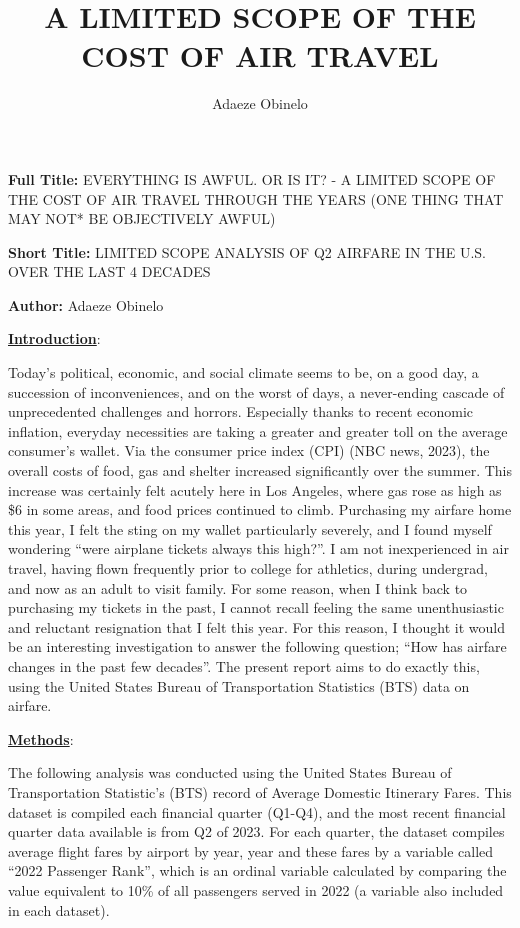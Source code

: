 \documentclass[
  letterpaper,
  DIV=11,
  numbers=noendperiod]{scrartcl}
\title{A LIMITED SCOPE OF THE COST OF AIR TRAVEL}
\author{Adaeze Obinelo}
\date{}
\begin{document}
\maketitle
\ifdefined\Shaded\renewenvironment{Shaded}{\begin{tcolorbox}[boxrule=0pt, interior hidden, breakable, frame hidden, sharp corners, enhanced, borderline west={3pt}{0pt}{shadecolor}]}{\end{tcolorbox}}\fi

\textbf{Full Title:} EVERYTHING IS AWFUL. OR IS IT? - A LIMITED SCOPE OF
THE COST OF AIR TRAVEL THROUGH THE YEARS (ONE THING THAT MAY NOT* BE
OBJECTIVELY AWFUL)

\textbf{Short Title:} LIMITED SCOPE ANALYSIS OF Q2 AIRFARE IN THE U.S.
OVER THE LAST 4 DECADES

\textbf{Author:} Adaeze Obinelo

\ul{\textbf{Introduction}}:

Today's political, economic, and social climate seems to be, on a good
day, a succession of inconveniences, and on the worst of days, a
never-ending cascade of unprecedented challenges and horrors. Especially
thanks to recent economic inflation, everyday necessities are taking a
greater and greater toll on the average consumer's wallet. Via the
consumer price index (CPI) (NBC news, 2023), the overall costs of food,
gas and shelter increased significantly over the summer. This increase
was certainly felt acutely here in Los Angeles, where gas rose as high
as \$6 in some areas, and food prices continued to climb. Purchasing my
airfare home this year, I felt the sting on my wallet particularly
severely, and I found myself wondering ``were airplane tickets always
this high?''. I am not inexperienced in air travel, having flown
frequently prior to college for athletics, during undergrad, and now as
an adult to visit family. For some reason, when I think back to
purchasing my tickets in the past, I cannot recall feeling the same
unenthusiastic and reluctant resignation that I felt this year. For this
reason, I thought it would be an interesting investigation to answer the
following question; ``How has airfare changes in the past few decades''.
The present report aims to do exactly this, using the United States
Bureau of Transportation Statistics (BTS) data on airfare.

\ul{\textbf{Methods}}:

The following analysis was conducted using the United States Bureau of
Transportation Statistic's (BTS) record of Average Domestic Itinerary
Fares. This dataset is compiled each financial quarter (Q1-Q4), and the
most recent financial quarter data available is from Q2 of 2023. For
each quarter, the dataset compiles average flight fares by airport by
year, year and these fares by a variable called ``2022 Passenger Rank'',
which is an ordinal variable calculated by comparing the value
equivalent to 10\% of all passengers served in 2022 (a variable also
included in each dataset).
\end{document}
